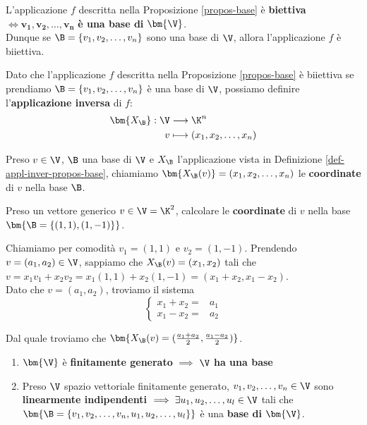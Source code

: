 \documentclass[11pt, a4paper, titlepage, oneside]{scrbook}
\begin{document}
\begin{Proposizione}[Corollario]
\label{propos-corol-basi}
L'applicazione $f$ descritta nella Proposizione \ref{propos-base} è \textbf{biettiva} $ \iff \bm{v_1, v_2, \ldots, v_n}$ \textbf{è una base di} $\bm{\V}$. \\ 
Dunque se $\B = \{v_1, v_2, \ldots, v_n\}$ sono una base di $\V$, allora l'applicazione $f$ è biiettiva.
\end{Proposizione}

\begin{Definizione}
\label{def-appl-inver-propos-base}
Dato che l'applicazione $f$ descritta nella Proposizione \ref{propos-base} è biiettiva se prendiamo $\B = \{v_1, v_2, \ldots, v_n\}$ è una base di $\V$, possiamo definire l'\textbf{applicazione inversa} di $f$:
\begin{align*}
\bm{X_\B} : \V &\longrightarrow \K^n \\
v &\longmapsto (x_1, x_2, \ldots, x_n)
\end{align*}
\end{Definizione}

\begin{Definizione}[Coordinate]
\label{def-coordinate}
Preso $v \in \V$, $\B$ una base di $\V$ e $X_\B$ l'applicazione vista in Definizione \ref{def-appl-inver-propos-base}, chiamiamo $\bm{X_\B(v)} = (x_1, x_2, \ldots, x_n)$ le \textbf{coordinate} di $v$ nella base $\B$.
\end{Definizione}

\Esempio \nopagebreak

Preso un vettore generico $v \in \V = \K^2$, calcolare le \textbf{coordinate} di $v$ nella base $\bm{\B = \{(1,1),(1,-1)\}}$.

Chiamiamo per comodità $v_1 = (1,1)$ e $v_2 = (1,-1)$. Prendendo $v = (a_1, a_2) \in \V$, sappiamo che $X_\B(v) = (x_1,x_2)$ tali che $v = x_1 v_1 + x_2 v_2 = x_1(1,1) + x_2(1,-1) = (x_1 + x_2, x_1 - x_2)$.\\
Dato che $v = (a_1, a_2)$, troviamo il sistema
\[
\begin{cases}
 x_1 + x_2 =& a_1 \\
 x_1 - x_2 =& a_2 
\end{cases}
\]

Dal quale troviamo che $\bm{X_\B(v) = (\frac{a_1+a_2}{2}, \frac{a_1-a_2}{2})}$.
 
\begin{Proposizione}[]
\label{propos-base-2}
\begin{enumerate}[label=\Roman*)]
    \item $\bm{\V}$ è \textbf{finitamente generato} $\implies$ $\V$ \textbf{ha una base}
    \item Preso $\V$ spazio vettoriale finitamente generato, $v_1,v_2, \ldots, v_n \in \V$ sono \textbf{linearmente indipendenti} $\implies \exists u_1, u_2, \ldots, u_l \in \V$ tali che $\bm{\B = \{v_1, v_2, \ldots, v_n, u_1, u_2, \ldots, u_l\}}$ è una \textbf{base di} $\bm{\V}$. 
\end{enumerate}
\end{Proposizione}
\end{document}
